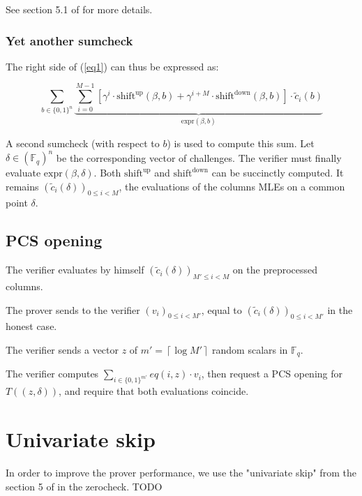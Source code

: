 \documentclass{article}
\newcommand{\Fq}{\mathbb F_q}
\newcommand{\Pol}{T}
\begin{document}
See section 5.1 of \cite{ccs} for more details.

\subsubsection{Yet another sumcheck}

The right side of (\ref{eq1}) can thus be expressed as:

$$\sum_{b \in \{0, 1\}^n} \underbrace{\sum_{i = 0}^{M-1} [\gamma^i \cdot \text{shift}^{\text{up}}(\beta, b) + \gamma^{i+M} \cdot \text{shift}^{\text{down}}(\beta, b) ] \cdot \tilde{c}_i(b)}_{\text{expr}(\beta, b)}$$

A second sumcheck (with respect to $b$) is used to compute this sum. Let $\delta \in (\Fq)^n$ be the corresponding vector of challenges. The verifier must finally evaluate $\text{expr}(\beta, \delta)$. Both $\text{shift}^{\text{up}}$ and $\text{shift}^{\text{down}}$ can be succinctly computed. It remains $(\tilde{c}_i(\delta))_{0 \leq i < M}$, the evaluations of the columns MLEs on a common point $\delta$.

\subsection{PCS opening}

The verifier evaluates by himself $(\tilde{c}_i(\delta))_{M' \leq i < M}$ on the preprocessed columns.

The prover sends to the verifier $(v_i)_{0 \leq i < M'}$, equal to $(\tilde{c}_i(\delta))_{0 \leq i < M'}$ in the honest case.

The verifier sends a vector $z$ of $m' = \left\lceil  \log M' \right\rceil$ random scalars in $\Fq$.

The verifier computes $\sum_{i \in \{0, 1\}^{m'}} eq(i, z) \cdot v_i$, then request a PCS opening for $\Pol((z, \delta))$, and require that both evaluations coincide.

\section{Univariate skip}

In order to improve the prover performance, we use the "univariate skip" from the section 5 of \cite{univariate_skip} in the zerocheck. TODO 





\end{document}
